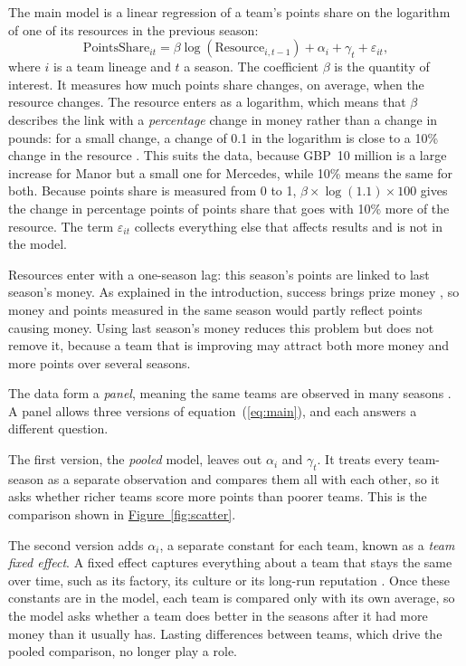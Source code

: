 \documentclass[11pt,a4paper]{article}
\begin{document}
The main model is a linear regression of a team's points share on the logarithm of one of its
resources in the previous season:
\begin{equation}
  \text{PointsShare}_{it} = \beta \log(\text{Resource}_{i,t-1}) + \alpha_i + \gamma_t + \varepsilon_{it},
  \label{eq:main}
\end{equation}
where $i$ is a team lineage and $t$ a season. The coefficient $\beta$ is the quantity of interest. It measures how much
points share changes, on average, when the resource changes. The resource enters as a logarithm, which means that $\beta$
describes the link with a \textit{percentage} change in money rather than a change in pounds: for a small change, a change
of 0.1 in the logarithm is close to a 10\% change in the resource \citep[Chapter~6]{wooldridge2020}. This suits the data,
because GBP~10 million is a large increase for Manor but a small one for Mercedes, while 10\% means the same for both.
Because points share is measured from 0 to 1, $\beta \times \log(1.1) \times 100$ gives the change in percentage points of
points share that goes with 10\% more of the resource. The term $\varepsilon_{it}$ collects everything else that affects
results and is not in the model.

Resources enter with a one-season lag: this season's points are linked to
last season's money. As explained in the introduction, success brings prize money \citep{liberty2018}, so money and points
measured in the same season would partly reflect points causing money. Using last season's money reduces this problem but
does not remove it, because a team that is improving may attract both more money and more points over several seasons.

The data form a \textit{panel}, meaning the same teams are observed in many
seasons \citep[Chapter~10]{wooldridge2010}. A panel allows three versions of equation~(\ref{eq:main}), and each answers a different question.

The first version, the \textit{pooled} model, leaves out $\alpha_i$ and $\gamma_t$. It treats every team-season as a
separate observation and compares them all with each other, so it asks whether richer teams score more points than poorer
teams. This is the comparison shown in \hyperref[fig:scatter]{Figure~\ref*{fig:scatter}}.

The second version adds $\alpha_i$, a separate constant for each team, known as a \textit{team fixed effect}. A fixed effect
captures everything about a team that stays the same over time, such as its factory, its culture or its long-run reputation
\citep[Chapter~14]{wooldridge2020}. Once these constants are in the model, each team is compared only with its own average,
so the model asks whether a team does better in the seasons after it had more money than it usually has. Lasting
differences between teams, which drive the pooled comparison, no longer play a role.
\end{document}
